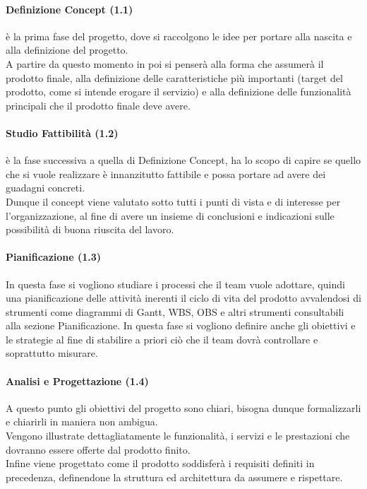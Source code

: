 \paragraph{Definizione Concept (1.1)}
\`{e} la prima fase del progetto, dove si raccolgono le idee per portare alla nascita e alla definizione del progetto.\\
A partire da questo momento in poi si penser\`{a} alla forma che assumer\`{a} il prodotto finale, alla  definizione delle caratteristiche pi\`{u} importanti (target del prodotto, come si intende erogare il servizio) e alla definizione delle funzionalit\`{a} principali che il prodotto finale deve avere.

\paragraph{Studio Fattibilit\`{a} (1.2)}
\`{e} la fase successiva a quella di Definizione Concept, ha lo scopo di capire se quello che si vuole realizzare \`{e} innanzitutto fattibile e possa portare ad avere dei guadagni concreti.\\
Dunque il concept viene valutato sotto tutti i punti di vista e di interesse per l'organizzazione, al fine di avere un insieme di conclusioni e indicazioni sulle possibilit\`{a} di buona riuscita del lavoro.

\paragraph{Pianificazione (1.3)}
In questa fase si vogliono studiare i processi che il team vuole adottare, quindi una pianificazione delle attivit\`{a} inerenti il ciclo di vita del prodotto avvalendosi di strumenti come diagrammi di Gantt, WBS, OBS e altri strumenti consultabili alla sezione Pianificazione. In questa fase si vogliono definire anche gli obiettivi e le strategie al fine di stabilire a priori ci\`{o} che il team dovr\`{a} controllare e soprattutto misurare.

\paragraph{Analisi e Progettazione (1.4)}
A questo punto gli obiettivi del progetto sono chiari, bisogna dunque formalizzarli e chiarirli in maniera non ambigua.\\
Vengono illustrate dettagliatamente le funzionalit\`{a}, i servizi e le prestazioni che dovranno essere offerte dal prodotto finito.\\
Infine viene progettato come il prodotto soddisfer\`{a} i requisiti definiti in precedenza, definendone la struttura ed architettura da assumere e rispettare.

